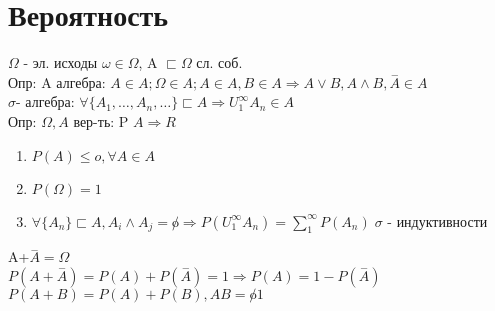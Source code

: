 \documentclass[12pt]{article}
\begin{document}
\section{Вероятность}
    $\varOmega$ - эл. исходы $\omega \in \varOmega$, A $\sqsubset \varOmega$ сл. соб.\\
    Опр: A алгебра: $A \in A; \varOmega \in A; A \in A,B \in A \Rightarrow A \lor B, A \land B, \overset{-}{A} \in A$ \\%
    $\sigma$- алгебра: $\forall \{A_1,\dots,A_n,\dots\}\sqsubset A \Rightarrow U_1^{\infty} A_n \in A$\\
    Опр: $\Omega, A$ вер-ть: P $A \Rightarrow R$\\
    \begin{enumerate}
        \item $P(A) \leq o, \forall A \in A$
        \item $P(\varOmega)=1$
        \item $\forall \{A_n\}\sqsubset A,A_i \land A_j = \not o \Rightarrow P(U_1^{\infty}A_n)=\sum_{1}^{\infty}
        P(A_n) \; \sigma$ - индуктивности
    \end{enumerate}
    A+$\overset{-}{A}=\varOmega$\\
    $P(A+\overset{-}{A})=P(A)+P(\overset{-}{A})=1 \Rightarrow P(A)=1-P(\overset{-}{A})$\\
    $P(A+B)=P(A)+P(B),AB=\not o 1$ 
\end{document}
